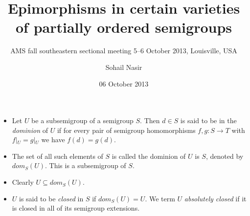 \documentclass[notes=show]{beamer}
\newenvironment{stepitemize}{\begin{itemize}[<+->]}{\end{itemize} }
\begin{document}
\title[Epis of posemigroup]{{\Large Epimorphisms in certain varieties of
partially ordered semigroups}}
\subtitle{{\small AMS fall southeastern sectional meeting 5--6 October 2013,
Louisville, USA}}
\author{Sohail Nasir}
\date{06 October 2013}
\maketitle

\begin{frame}%


\begin{stepitemize}
\item Let $U$ be a subsemigroup of a semigroup $S$. Then $d\in S$ is said to
be in the \textit{dominion} of $U$ if for every pair of semigroup
homomorphisms $f,g:S\longrightarrow T$ with $f\left\vert _{U}\right.
=g\left\vert _{U}\right. $ we have $f(d)=g(d)$.\bigskip

\item The set of all such elements of $S$ is called the dominion of $U$ is $%
S $, denoted by $dom_{S}(U)$. This is a subsemigroup of $S$.\bigskip

\item Clearly $U\subseteq dom_{S}(U)$.\bigskip

\item $U$ is said to be \textit{closed} in $S$ if $dom_{S}(U)=U$. We term $U$
\textit{absolutely closed} if it is closed in all of its semigroup
extensions.
\end{stepitemize}

\transboxout%
\end{frame}%
\end{document}
